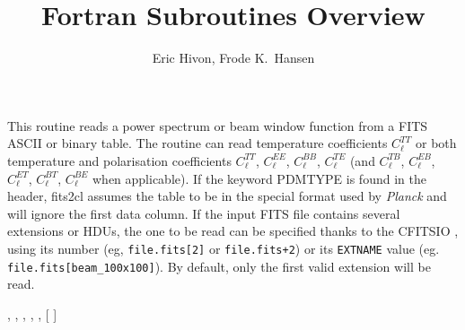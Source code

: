 
\sloppy


\title{\healpix Fortran Subroutines Overview}
 \section[fits2cl*]{ }
\label{sub:fits2cl}
\author{Eric Hivon, Frode K.~Hansen}

\begin{facility}
{This routine reads a power spectrum or beam window function from a FITS ASCII
or binary table. 
The routine can read temperature coefficients $C_\ell^{TT}$ or both temperature and 
polarisation coefficients $C_\ell^{TT}$, $C_\ell^{EE}$, $C_\ell^{BB}$, $C_\ell^{TE}$ (and  
$C_\ell^{TB}$, 
$C_\ell^{EB}$, 
$C_\ell^{ET}$, 
$C_\ell^{BT}$, 
$C_\ell^{BE}$ when applicable). If the 
keyword PDMTYPE is found in the header, fits2cl assumes the table to be in the 
special format used by {\em Planck} and will ignore the first data column. 
If the input FITS file contains several
extensions or HDUs, the one to be read can be specified thanks to the CFITSIO 
, using its number (eg, {\tt file.fits[2]} or {\tt file.fits+2}) or its
{\tt EXTNAME} value (eg. {\tt file.fits[beam\_100x100]}). By default, only the first valid
extension will be read.}
{\modFitstools}
\end{facility}

\begin{f90format}
{%
, %
, %
, %
, %
, [%
]}
\end{f90format}

